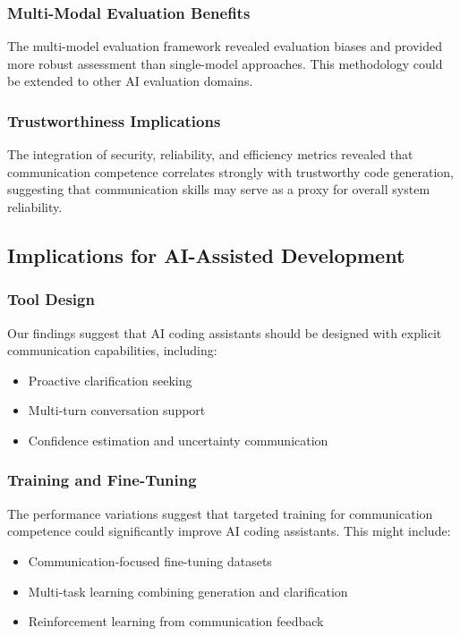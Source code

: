 \documentclass[conference]{IEEEtran}
\begin{document}
\subsubsection{Multi-Modal Evaluation Benefits}

The multi-model evaluation framework revealed evaluation biases and provided more robust assessment than single-model approaches. This methodology could be extended to other AI evaluation domains.

\subsubsection{Trustworthiness Implications}

The integration of security, reliability, and efficiency metrics revealed that communication competence correlates strongly with trustworthy code generation, suggesting that communication skills may serve as a proxy for overall system reliability.

\subsection{Implications for AI-Assisted Development}

\subsubsection{Tool Design}

Our findings suggest that AI coding assistants should be designed with explicit communication capabilities, including:

\begin{itemize}
    \item Proactive clarification seeking
    \item Multi-turn conversation support
    \item Confidence estimation and uncertainty communication
\end{itemize}

\subsubsection{Training and Fine-Tuning}

The performance variations suggest that targeted training for communication competence could significantly improve AI coding assistants. This might include:

\begin{itemize}
    \item Communication-focused fine-tuning datasets
    \item Multi-task learning combining generation and clarification
    \item Reinforcement learning from communication feedback
\end{itemize}
\end{document}
